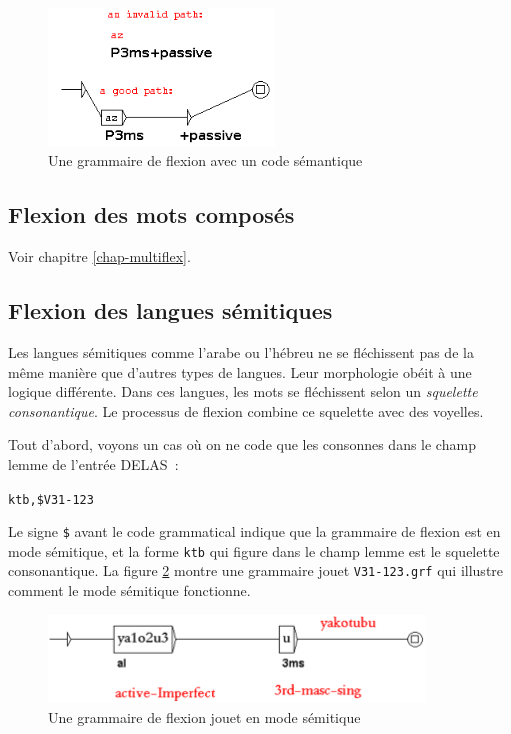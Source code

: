 \bigskip
\begin{figure}[!ht]
\begin{center}
\includegraphics[width=6cm]{resources/img/fig3-9sem.png}
\caption{Une grammaire de flexion avec un code sémantique\label{fig-inflection-sem}}
\end{center}
\end{figure}

\subsection{Flexion des mots composés}
Voir chapitre \ref{chap-multiflex}.

\subsection{Flexion des langues sémitiques}
\label{subsection-semitic-inflection}
Les langues  sémitiques comme l'arabe ou l'hébreu ne se fléchissent pas de la même manière 
que d'autres types de langues. Leur morphologie obéit à une logique différente.
Dans ces langues, les mots se fléchissent selon un \textit{squelette consonantique}. Le processus de
flexion combine ce squelette avec des voyelles.

\bigskip
\noindent Tout d'abord, voyons un cas où on ne code que les consonnes dans le champ lemme de l'entrée DELAS~:

\bigskip
\noindent \verb+ktb,$V31-123+

\bigskip
\noindent Le signe \verb+$+ avant le code grammatical indique que la grammaire de flexion est en mode sémitique, et
la forme \verb+ktb+ qui figure dans le champ lemme est le squelette consonantique. La figure \ref{semitic-grammar}
montre une grammaire jouet \verb+V31-123.grf+ qui illustre comment le mode sémitique fonctionne.

\bigskip
\begin{figure}[!ht]
\begin{center}
\includegraphics[width=10cm]{resources/img/fig3-15.png}
\caption{Une grammaire de flexion jouet en mode sémitique\label{semitic-grammar}}
\end{center}
\end{figure}

